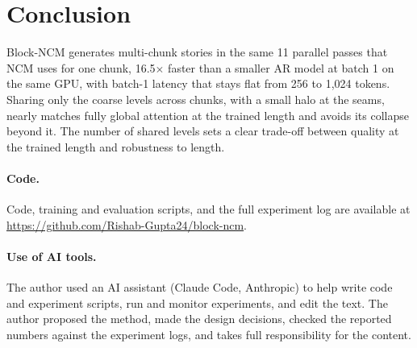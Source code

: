\documentclass[10pt,twocolumn]{article}
\begin{document}
\section{Conclusion}

Block-NCM generates multi-chunk stories in the same 11 parallel passes that NCM uses for one chunk, 16.5$\times$
faster than a smaller AR model at batch 1 on the same GPU, with batch-1 latency that stays flat from 256 to 1,024
tokens. Sharing only the coarse levels across chunks, with a small halo
at the seams, nearly matches fully global attention at the trained length and avoids its collapse beyond it. The
number of shared levels sets a clear trade-off between quality at the trained length and robustness to length.

\paragraph{Code.} Code, training and evaluation scripts, and the full experiment log are available at
\url{https://github.com/Rishab-Gupta24/block-ncm}.

\paragraph{Use of AI tools.} The author used an AI assistant (Claude Code, Anthropic) to help write code and
experiment scripts, run and monitor experiments, and edit the text. The author proposed the method, made the design
decisions, checked the reported numbers against the experiment logs, and takes full responsibility for the content.
\end{document}
